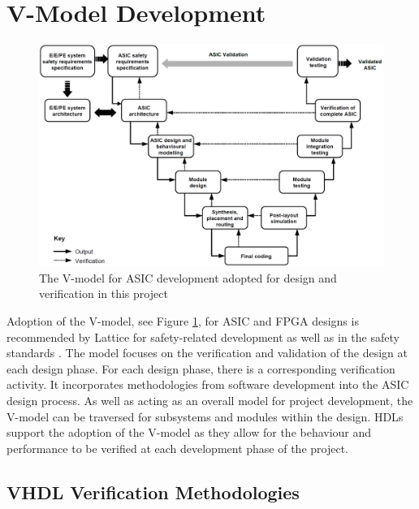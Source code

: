 \section{V-Model Development}

\begin{figure}[h]
\centering
\includegraphics[width=\textwidth]{images/V-model.PNG}
\caption{The V-model for ASIC development adopted for design and verification in this project\cite{IEC61508}}
\label{V-model}
\end{figure}

Adoption of the V-model, see Figure \ref{V-model}, for ASIC and FPGA designs is recommended by Lattice for safety-related development\cite{LatticeSafety} as well as in the safety standards \cite{Borcsok, IEC61508, HayekSRAM, HayekSafety, Bernardeschi}. The model focuses on the verification and validation of the design at each design phase\cite{Borcsok}. For each design phase, there is a corresponding verification activity\cite{Ceesay-Seitz,Borcsok}. It incorporates methodologies from software development into the ASIC design process\cite{HayekSRAM}. As well as acting as an overall model for project development, the V-model can be traversed for subsystems and modules within the design\cite{Ceesay-Seitz}. HDLs support the adoption of the V-model as they allow for the behaviour and performance to be verified at each development phase of the project\cite{Dubey}.

\subsection{VHDL Verification Methodologies}

